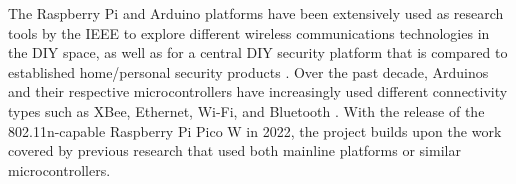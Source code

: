 The Raspberry Pi and Arduino platforms have been extensively used as research tools by the
IEEE to explore different wireless communications technologies in the DIY space, as well as
for a central DIY security platform that is compared to established home/personal security
products \cite{sarhan2020}. Over the past decade, Arduinos and their respective
microcontrollers have increasingly used different connectivity types such as XBee, Ethernet,
Wi-Fi, and Bluetooth \cite{sarhan2020}. With the release of the 802.11n-capable Raspberry
Pi Pico W in 2022, the project builds upon the work covered by previous research that used
both mainline platforms or similar microcontrollers.
